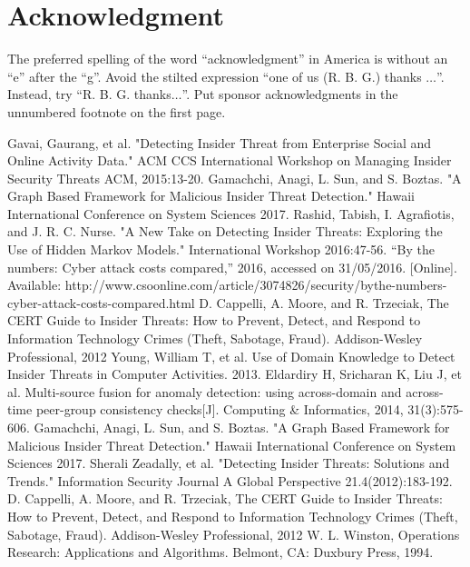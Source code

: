 \documentclass[conference]{IEEEtran}
\begin{document}
\section*{Acknowledgment}

The preferred spelling of the word ``acknowledgment'' in America is without 
an ``e'' after the ``g''. Avoid the stilted expression ``one of us (R. B. 
G.) thanks $\ldots$''. Instead, try ``R. B. G. thanks$\ldots$''. Put sponsor 
acknowledgments in the unnumbered footnote on the first page.



\begin{thebibliography}{00}
Gavai, Gaurang, et al. "Detecting Insider Threat from Enterprise Social and Online Activity Data." ACM CCS International Workshop on Managing Insider Security Threats ACM, 2015:13-20.
 Gamachchi, Anagi, L. Sun, and S. Boztas. "A Graph Based Framework for Malicious Insider Threat Detection." Hawaii International Conference on System Sciences 2017.
 Rashid, Tabish, I. Agrafiotis, and J. R. C. Nurse. "A New Take on Detecting Insider Threats: Exploring the Use of Hidden Markov Models." International Workshop 2016:47-56.
 “By the numbers: Cyber attack costs compared,” 2016, accessed on 31/05/2016. [Online]. Available: http://www.csoonline.com/article/3074826/security/bythe-numbers-cyber-attack-costs-compared.html
  D. Cappelli, A. Moore, and R. Trzeciak, The CERT Guide to Insider Threats: How to Prevent, Detect, and Respond to Information Technology Crimes (Theft, Sabotage, Fraud). Addison-Wesley Professional, 2012
 Young, William T, et al. Use of Domain Knowledge to Detect Insider Threats in Computer Activities.  2013.
Eldardiry H, Sricharan K, Liu J, et al. Multi-source fusion for anomaly detection: using across-domain and across-time peer-group consistency checks[J]. Computing \& Informatics, 2014, 31(3):575-606.
 Gamachchi, Anagi, L. Sun, and S. Boztas. "A Graph Based Framework for Malicious Insider Threat Detection." Hawaii International Conference on System Sciences 2017.
 Sherali   Zeadally, et al. "Detecting Insider Threats: Solutions and Trends." Information Security Journal A Global Perspective 21.4(2012):183-192.
  D. Cappelli, A. Moore, and R. Trzeciak, The CERT Guide to Insider Threats: How to Prevent, Detect, and Respond
to Information Technology Crimes (Theft, Sabotage, Fraud). Addison-Wesley Professional, 2012
W. L. Winston, Operations Research: Applications and Algorithms. Belmont, CA: Duxbury Press, 1994.

\end{thebibliography}
\end{document}
